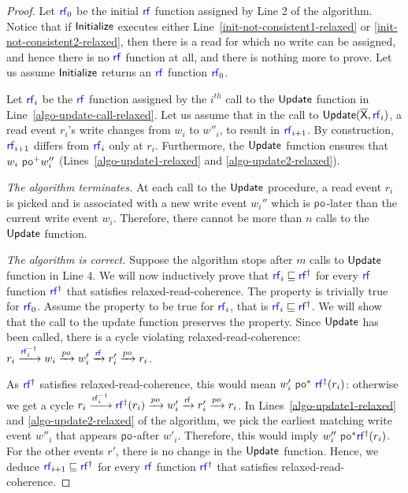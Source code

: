 \begin{proof}
Let $\rf_0$ be the initial $\rf$ function assigned by Line 2 of the algorithm. Notice that if $\mathsf{Initialize}$ executes either Line~\ref{init-not-consistent1-relaxed} or \ref{init-not-consistent2-relaxed}, then there is a read for which no write can be assigned, and hence there is no $\rf$ function at all, and there is nothing more to prove. Let us assume $\mathsf{Initialize}$ returns an $\rf$ function $\rf_0$. 

Let $\rf_i$ be the $\rf$ function assigned by the $i^{th}$ call to the $\mathsf{Update}$ function  in Line~\ref{algo-update-call-relaxed}. Let us assume that in the call to $\update(\expartial, \rf_i)$, a read event $r_i$'s write changes from $w_i$ to $w''_i$, to result in $\rf_{i+1}$. 
By construction, $\rf_{i+1}$ differs from $\rf_i$ only at $r_i$. Furthermore, the $\mathsf{Update}$ function ensures that  $w_i ~\po^+ w''_i$ (Lines~\ref{algo-update1-relaxed} and \ref{algo-update2-relaxed}). 

\emph{The algorithm terminates.} At each call to the $\mathsf{Update}$ procedure, a read event $r_i$ is picked and is associated with a new write event $w_i''$ which is $\po$-later than the current write event $w_i$. Therefore, there cannot be more than $n$ calls to the  $\mathsf{Update}$ function. 

\emph{The algorithm is correct.} Suppose the algorithm stops after $m$ calls to $\mathsf{Update}$ function in Line 4. We will now inductively prove that $\rf_i \sqsubseteq \rf^\dagger$ for every  $\rf$ function $\rf^\dagger$ that satisfies relaxed-read-coherence. The property is trivially true for $\rf_0$. Assume the property to be true for $\rf_{i}$, that is $\rf_i \sqsubseteq \rf^\dagger$. We will show that the call to the update function preserves the property. Since $\mathsf{Update}$ has been called, there is a cycle violating relaxed-read-coherence: $r_i \xra{\rf_i^{-1}} w_i \xra{po} w'_i \xra{\rf} r'_i \xra{po} r_i$. 

As $\rf^{\dagger}$ satisfies relaxed-read-coherence, this would mean $w'_i ~\po^*~\rf^{\dagger}(r_i)$: otherwise we get a cycle $r_i \xra{\rf_i^{-1}} \rf^{\dagger}(r_i) \xra{po} w'_i \xra{\rf} r'_i \xra{po} r_i$. In Lines~\ref{algo-update1-relaxed} and \ref{algo-update2-relaxed} of the algorithm, we pick the earliest matching write event $w''_i$ that appears $\po$-after $w'_i$. Therefore, this would imply $w''_i~\po^* \rf^{\dagger}(r_i)$. For the other events $r'$, there is no change in the $\mathsf{Update}$ function. Hence, we deduce $\rf_{i+1} \sqsubseteq \rf^{\dagger}$ for every $\rf$ function $\rf^{\dagger}$ that satisfies relaxed-read-coherence.


\end{proof}
